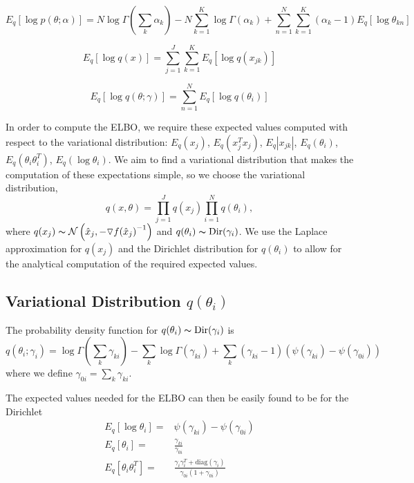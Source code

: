 \documentclass[11pt]{amsart}
\begin{document}
\begin{equation}\label{eqn:llbnd3}
	E_q \left[ \log p(\theta; \alpha) \right] = N \log \Gamma \left( \sum_k \alpha_k \right) - N \sum_{k=1}^K \log \Gamma(\alpha_k) + \sum_{n=1}^N \sum_{k=1}^K (\alpha_k - 1) E_q[ \log \theta_{kn} ]
\end{equation}

\begin{equation}\label{eqn:llbnd4}
	E_q \left[ \log q(x) \right] = \sum_{j=1}^J \sum_{k=1}^K E_q \left[ \log q(x_{jk}) \right]
\end{equation}

\begin{equation}\label{eqn:llbnd5}
	E_q \left[ \log q(\theta; \gamma) \right] = \sum_{n=1}^N E_q \left[ \log q(\theta_i) \right]
\end{equation}

In order to compute the ELBO, we require these expected values computed with respect to the variational distribution: $E_q(x_j)$, $E_q(x_j^Tx_j)$, $E_q |x_{jk} |$, $E_q(\theta_i)$, $E_q(\theta_i \theta_i^T)$, $E_q(\log \theta_i)$. We aim to find a variational distribution that makes the computation of these expectations simple, so we choose the variational distribution,
\begin{equation}
	q(x, \theta) =\prod_{j=1}^J q(x_j) \prod_{i=1}^N q(\theta_i),
\end{equation}
where $q(x_j) \thicksim \mathcal{N} \left( \hat{x}_{j}, {-\triangledown f( \hat{x}_j ) }^{-1} \right)$ and $q(\theta_i) \thicksim \text{Dir}(\gamma_i)$. We use the Laplace approximation for $q(x_j)$ and the Dirichlet distribution for $q(\theta_i)$ to allow for the analytical computation of the required expected values.

\subsection{Variational Distribution $q(\theta_i)$}

The probability density function for $q(\theta_i) \thicksim \text{Dir}(\gamma_i)$ is 
\begin{equation}
	q(\theta_i; \gamma_i) = \log \Gamma \left( \sum_k \gamma_{ki} \right) - \sum_k \log \Gamma (\gamma_{ki}) + \sum_k (\gamma_{ki} - 1) \left( \psi(\gamma_{ki}) - \psi ( \gamma_{0i} ) \right)
\end{equation}
where we define $\gamma_{0i} = \sum_k \gamma_{ki}$.

The expected values needed for the ELBO can then be easily found to be for the Dirichlet
\begin{eqnarray}
	E_q[ \log \theta_i ] =& \psi(\gamma_{ki}) - \psi ( \gamma_{0i} ) \\
	E_q[\theta_i] =& \frac{ \gamma_{ki} } { \gamma_{0i} } \\
	E_q[\theta_i \theta_i^T] =& \frac{ \gamma_i \gamma_i^T + \text{diag}(\gamma_i) } { \gamma_{0i} ( 1 + \gamma_{0i} ) }
\end{eqnarray}
\end{document}
